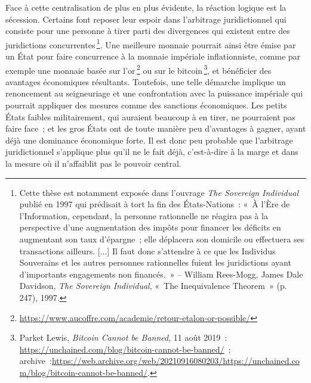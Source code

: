 \documentclass[a4paper,notitlepage]{article}
\newcommand{\eng}[1]{{\NoAutoSpaceBeforeFDP\emph{#1}}}  %
\newcommand{\sfootnote}{\,\footnote}
\begin{document}
Face à cette centralisation de plus en plus évidente, la réaction logique est la sécession. Certains font reposer leur espoir dans l'arbitrage juridictionnel qui consiste pour une personne à tirer parti des divergences qui existent entre des juridictions concurrentes\sfootnote{Cette thèse est notamment exposée dans l'ouvrage \eng{The Sovereign Individual} publié en 1997 qui prédisait à tort la fin des États-Nations~:  «~À l'Ère de l'Information, cependant, la personne rationnelle ne réagira pas à la perspective d'une augmentation des impôts pour financer les déficits en augmentant son taux d'épargne~; elle déplacera son domicile ou effectuera ses transactions ailleurs. [...] Il faut donc s'attendre à ce que les Individus Souverains et les autres personnes rationnelles fuient les juridictions ayant d'importants engagements non financés.~» -- William Rees-Mogg, James Dale Davidson, \eng{The Sovereign Individual}, «~The Inequivalence Theorem~» (p. 247), 1997.}. Une meilleure monnaie pourrait ainsi être émise par un État pour faire concurrence à la monnaie impériale inflationniste, comme par exemple une monnaie basée sur l'or\sfootnote{\url{https://www.aucoffre.com/academie/retour-etalon-or-possible/}} ou sur le bitcoin\sfootnote{Parket Lewis, \eng{Bitcoin Cannot be Banned}, 11 août 2019~: \url{https://unchained.com/blog/bitcoin-cannot-be-banned/}~; archive~:\url{https://web.archive.org/web/20210916080203/https://unchained.com/blog/bitcoin-cannot-be-banned/}.}, et bénéficier des avantages économiques résultants. Toutefois, une telle démarche implique un renoncement au seigneuriage et une confrontation avec la puissance impériale qui pourrait appliquer des mesures comme des sanctions économiques. Les petits États faibles militairement, qui auraient beaucoup à en tirer, ne pourraient pas faire face~; et les gros États ont de toute manière peu d'avantages à gagner, ayant déjà une dominance économique forte. Il est donc peu probable que l'arbitrage juridictionnel s'applique plus qu'il ne le fait déjà, c'est-à-dire à la marge et dans la mesure où il n'affaiblit pas le pouvoir central. %
\end{document}
